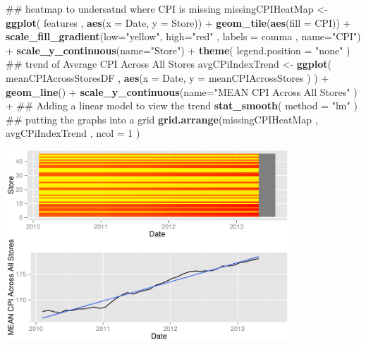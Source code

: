\documentclass[]{article}
\newenvironment{Shaded}{\begin{snugshade}}{\end{snugshade}}
\newcommand{\KeywordTok}[1]{\textcolor[rgb]{0.13,0.29,0.53}{\textbf{{#1}}}}
\newcommand{\DataTypeTok}[1]{\textcolor[rgb]{0.13,0.29,0.53}{{#1}}}
\newcommand{\DecValTok}[1]{\textcolor[rgb]{0.00,0.00,0.81}{{#1}}}
\newcommand{\StringTok}[1]{\textcolor[rgb]{0.31,0.60,0.02}{{#1}}}
\newcommand{\NormalTok}[1]{{#1}}
\begin{document}
\begin{Shaded}
\begin{Highlighting}[]
\NormalTok{## heatmap to undersatnd where CPI is missing}
\NormalTok{missingCPIHeatMap <-}\StringTok{ }\KeywordTok{ggplot}\NormalTok{( features , }\KeywordTok{aes}\NormalTok{(}\DataTypeTok{x =} \NormalTok{Date, }\DataTypeTok{y =} \NormalTok{Store)) +}\StringTok{ }
\StringTok{  }\KeywordTok{geom_tile}\NormalTok{(}\KeywordTok{aes}\NormalTok{(}\DataTypeTok{fill =} \NormalTok{CPI)) +}
\StringTok{  }\KeywordTok{scale_fill_gradient}\NormalTok{(}\DataTypeTok{low=}\StringTok{"yellow"}\NormalTok{, }\DataTypeTok{high=}\StringTok{"red"} \NormalTok{, }\DataTypeTok{labels =} \NormalTok{comma , }\DataTypeTok{name=}\StringTok{"CPI"}\NormalTok{) +}
\StringTok{  }\KeywordTok{scale_y_continuous}\NormalTok{(}\DataTypeTok{name=}\StringTok{"Store"}\NormalTok{) +}
\StringTok{  }\KeywordTok{theme}\NormalTok{( }\DataTypeTok{legend.position =} \StringTok{"none"} \NormalTok{)}
\NormalTok{## trend of Average CPI Across All Stores}
\NormalTok{avgCPiIndexTrend <-}\StringTok{ }\KeywordTok{ggplot}\NormalTok{( meanCPIAcrossStoresDF , }\KeywordTok{aes}\NormalTok{(}\DataTypeTok{x =} \NormalTok{Date, }\DataTypeTok{y =} \NormalTok{meanCPIAcrossStores ) ) +}\StringTok{ }
\StringTok{  }\KeywordTok{geom_line}\NormalTok{() +}
\StringTok{  }\KeywordTok{scale_y_continuous}\NormalTok{(}\DataTypeTok{name=}\StringTok{"MEAN CPI Across All Stores"} \NormalTok{) +}
\StringTok{  }\NormalTok{## Adding a linear model to view the trend}
\StringTok{  }\KeywordTok{stat_smooth}\NormalTok{( }\DataTypeTok{method =} \StringTok{"lm"} \NormalTok{)}
\NormalTok{## putting the graphs into a grid}
\KeywordTok{grid.arrange}\NormalTok{(missingCPIHeatMap , avgCPiIndexTrend , }\DataTypeTok{ncol =} \DecValTok{1} \NormalTok{)}
\end{Highlighting}
\end{Shaded}

\includegraphics[width=400px]{PredictingWeeklySalesAtWalmart_files/figure-latex/CPIMissingHeatMap-1}
\end{document}
